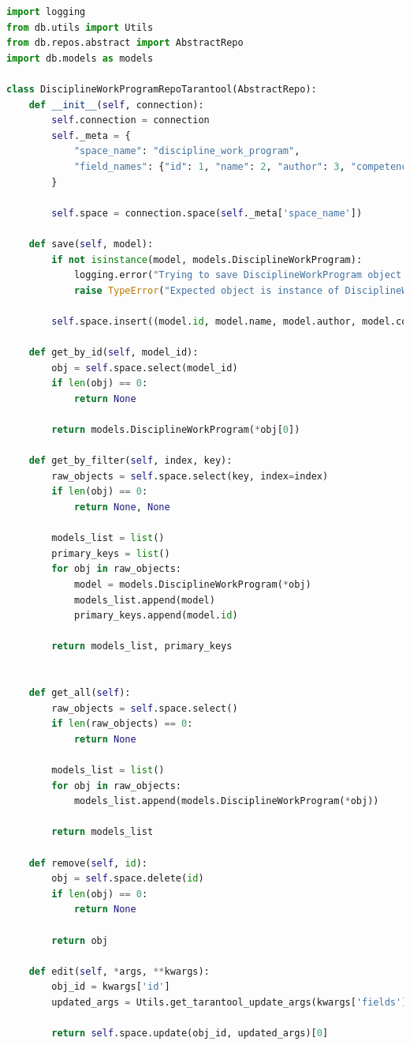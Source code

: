 \begin{lstlisting}[label=lst:db-tarantool, caption=Листинг модуля взаимодействия с СУБД Tarantool, language=python]
import logging
from db.utils import Utils
from db.repos.abstract import AbstractRepo
import db.models as models

class DisciplineWorkProgramRepoTarantool(AbstractRepo):
	def __init__(self, connection):
		self.connection = connection
		self._meta = {
			"space_name": "discipline_work_program",
			"field_names": {"id": 1, "name": 2, "author": 3, "competency": 4}
		}

		self.space = connection.space(self._meta['space_name'])

	def save(self, model):
		if not isinstance(model, models.DisciplineWorkProgram):
			logging.error("Trying to save DisciplineWorkProgram object of invalid type")
			raise TypeError("Expected object is instance of DisciplineWorkProgram")

		self.space.insert((model.id, model.name, model.author, model.competency))

	def get_by_id(self, model_id):
		obj = self.space.select(model_id)
		if len(obj) == 0:
			return None

		return models.DisciplineWorkProgram(*obj[0])

	def get_by_filter(self, index, key):
		raw_objects = self.space.select(key, index=index)
		if len(obj) == 0:
			return None, None

		models_list = list()
		primary_keys = list()
		for obj in raw_objects:
			model = models.DisciplineWorkProgram(*obj)
			models_list.append(model)
			primary_keys.append(model.id)

		return models_list, primary_keys


	def get_all(self):
		raw_objects = self.space.select()
		if len(raw_objects) == 0:
			return None

		models_list = list()
		for obj in raw_objects:
			models_list.append(models.DisciplineWorkProgram(*obj))

		return models_list

	def remove(self, id):
		obj = self.space.delete(id)
		if len(obj) == 0:
			return None

		return obj

	def edit(self, *args, **kwargs):
		obj_id = kwargs['id']
		updated_args = Utils.get_tarantool_update_args(kwargs['fields'], self._meta['field_names'])

		return self.space.update(obj_id, updated_args)[0]



\end{lstlisting}
